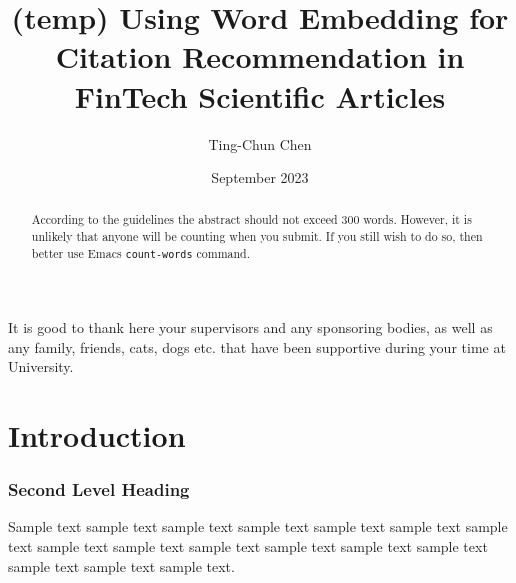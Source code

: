 \documentclass[11pt]{uonthesis}
\title{(temp) Using Word Embedding for Citation Recommendation 
in FinTech Scientific Articles}
\author{Ting-Chun Chen}
\date{September 2023}
\begin{document}
\begin{frontmatter}
\maketitle
\tableofcontents

\begin{abstract}
According to the guidelines the abstract should not exceed 300 words.
However, it is unlikely that anyone will be counting when you submit.
If you still wish to do so, then better use Emacs \verb|count-words|
command.
\end{abstract}

\begin{acknowledgements}
It is good to thank here your supervisors and any sponsoring bodies,
as well as any family, friends, cats, dogs etc. that have been
supportive during your time at University.
\end{acknowledgements}


\end{frontmatter}

\chapter{Introduction}





\subsection{Second Level Heading}

Sample text sample text sample text sample text sample text sample
text sample text sample text sample text sample text sample text
sample text sample text sample text sample text sample text.
\end{document}

